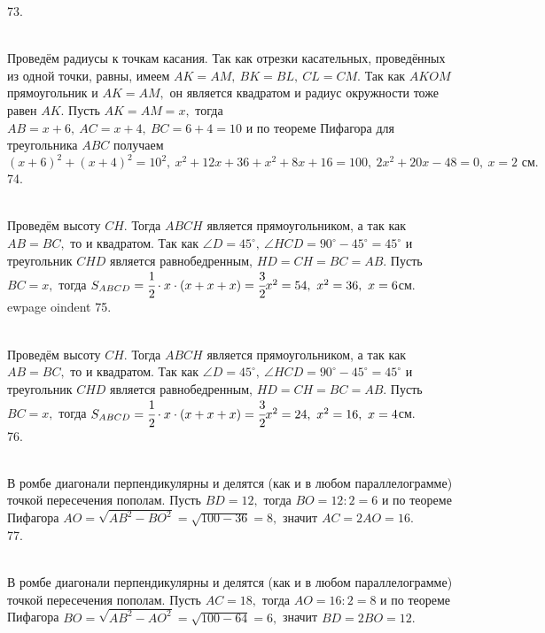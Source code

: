 73. \begin{figure}[ht!]
\end{figure}\\
Проведём радиусы к точкам касания. Так как отрезки касательных, проведённых из одной точки, равны, имеем $AK=AM,\ BK=BL,\ CL=CM.$ Так как $AKOM$ прямоугольник и $AK=AM,$ он является квадратом и радиус окружности тоже равен $AK.$ Пусть $AK=AM=x,$ тогда $AB=x+6,\ AC=x+4,\ BC=6+4=10$ и по теореме Пифагора для треугольника $ABC$ получаем $(x+6)^2+(x+4)^2=10^2,\ x^2+12x+36+x^2+8x+16=100,\ 2x^2+20x-48=0,\ x=2\text{ см}.$\\
74. \begin{figure}[ht!]
\end{figure}\\
Проведём высоту $CH.$ Тогда $ABCH$ является прямоугольником, а так как $AB=BC,$ то и квадратом. Так как $\angle D=45^\circ,\ \angle HCD=90^\circ-45^\circ=45^\circ$ и треугольник $CHD$ является равнобедренным, $HD=CH=BC=AB.$ Пусть $BC=x,$ тогда $S_{ABCD}=\cfrac{1}{2}\cdot{x}\cdot(x+x+x)=\cfrac{3}{2}x^2=54,\ x^2=36,\ x=6$см.
ewpage
oindent
75. \begin{figure}[ht!]
\end{figure}\\
Проведём высоту $CH.$ Тогда $ABCH$ является прямоугольником, а так как $AB=BC,$ то и квадратом. Так как $\angle D=45^\circ,\ \angle HCD=90^\circ-45^\circ=45^\circ$ и треугольник $CHD$ является равнобедренным, $HD=CH=BC=AB.$ Пусть $BC=x,$ тогда $S_{ABCD}=\cfrac{1}{2}\cdot{x}\cdot(x+x+x)=\cfrac{3}{2}x^2=24,\ x^2=16,\ x=4$см.\\
76. \begin{figure}[ht!]
\end{figure}\\
В ромбе диагонали перпендикулярны и делятся (как и в любом параллелограмме) точкой пересечения пополам. Пусть $BD=12,$ тогда $BO=12:2=6$ и по теореме Пифагора $AO=\sqrt{AB^2-BO^2}=\sqrt{100-36}=8,$ значит $AC=2AO=16.$\\
77. \begin{figure}[ht!]
\end{figure}\\
В ромбе диагонали перпендикулярны и делятся (как и в любом параллелограмме) точкой пересечения пополам. Пусть $AC=18,$ тогда $AO=16:2=8$ и по теореме Пифагора $BO=\sqrt{AB^2-AO^2}=\sqrt{100-64}=6,$ значит $BD=2BO=12.$\\
